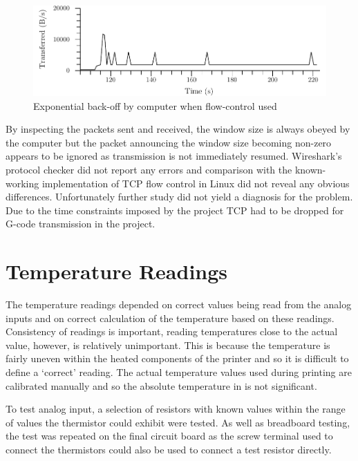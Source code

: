 		\begin{figure}
			\includegraphics[width=1\textwidth]{diagrams/uIPFlowControl.pdf}
			\caption{Exponential back-off by computer when \uIP{} flow-control used}
			\label{fig:uIPFlowControl}
		\end{figure}
		
		By inspecting the packets sent and received, the window size is always
		obeyed by the computer but the packet announcing the window size becoming
		non-zero appears to be ignored as transmission is not immediately resumed.
		Wireshark's protocol checker did not report any errors and comparison with
		the known-working implementation of TCP flow control in Linux did not reveal
		any obvious differences. Unfortunately further study did not yield a
		diagnosis for the problem. Due to the time constraints imposed by the
		project TCP had to be dropped for G-code transmission in the project.
	
	\section{Temperature Readings}
		
		The temperature readings depended on correct values being read from the
		analog inputs and on correct calculation of the temperature based on these
		readings. Consistency of readings is important, reading temperatures close
		to the actual value, however, is relatively unimportant. This is because the
		temperature is fairly uneven within the heated components of the printer and
		so it is difficult to define a `correct' reading. The actual temperature
		values used during printing are calibrated manually and so the absolute
		temperature in \dC{} is not significant.
		
		To test analog input, a selection of resistors with known values within the
		range of values the thermistor could exhibit were tested. As well as
		breadboard testing, the test was repeated on the final circuit board as the
		screw terminal used to connect the thermistors could also be used to connect
		a test resistor directly.
		
